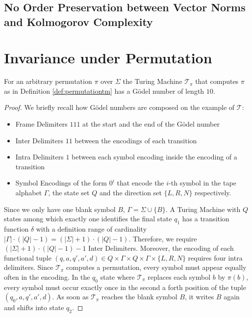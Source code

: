 \subsection{No Order Preservation between Vector Norms and Kolmogorov Complexity}
\section{Invariance under Permutation}
\begin{lemma}
	\label{lemma:permutation-complexity-bound}
	For an arbitrary permutation $\pi$ over $\Sigma$ the Turing Machine $\mathcal{T}_\pi$ that computes $\pi$ as in Definition \ref{def:permutationtm} has a G\"odel number of length $10$. 	
\end{lemma}
\begin{proof}
	We briefly recall how G\"odel numbers are composed on the example of $\mathcal{T}$:
	\begin{itemize}
		\item Frame Delimiters $111$ at the start and the end of the G\"odel number
		\item Inter Delimiters $11$ between the encodings of each transition
		\item Intra Delimiters $1$ between each symbol encoding inside the encoding of a transition
		\item Symbol Encodings of the form $0^i$ that encode the $i$-th symbol in the tape alphabet $\Gamma$, the state set $Q$ and the direction set $\{L,R,N\}$ respectively.
	\end{itemize}
	Since we only have one blank symbol $B$, $\Gamma=\Sigma\cup\{B\}$.
	A Turing Machine with $Q$ states among which exactly one identifies the final state $q_1$ has a transition function $\delta$ with a definition range of cardinality $|\Gamma|\cdot(|Q|-1)=(|\Sigma|+1)\cdot(|Q|-1)$.
	Therefore, we require $(|\Sigma|+1)\cdot(|Q|-1)-1$ Inter Delimiters.
	Moreover, the encoding of each functional tuple $(q,a,q',a',d)\in Q\times \Gamma \times Q \times \Gamma \times \{L,R,N\}$ requires four intra delimiters.
	Since $\mathcal{T}_\pi$ computes a permutation, every symbol must appear equally often in the encoding.
	In the $q_0$ state where $\mathcal{T}_\pi$ replaces each symbol $b$ by $\pi(b)$, every symbol must occur exactly once in the second a forth position of the tuple $(q_0,a,q',a',d)$. As soon as $\mathcal{T}_\pi$ reaches the blank symbol $B$, it writes $B$ again and shifts into state $q_2$.
	

\end{proof}
